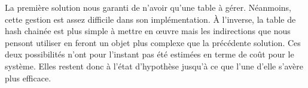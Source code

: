      La première solution nous garanti de n'avoir qu'une table à
      gérer. Néanmoins, cette gestion est assez difficile dans son
      implémentation. À l'inverse, la table de hash chainée est plus simple à
      mettre en \oe uvre mais les indirections que nous pensont utiliser en
      feront un objet plus complexe que la précédente solution. Ces deux
      possibilités n'ont pour l'instant pas été estimées en terme de coût pour
      le système. Elles restent donc à l'état d'hypothèse jusqu'à ce que l'une
      d'elle s'avère plus efficace.





